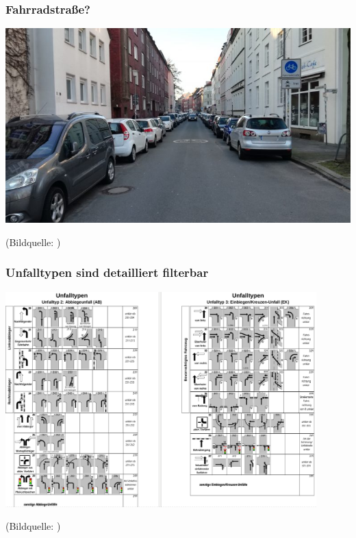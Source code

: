 \documentclass{beamer}
\begin{document}
\begin{frame}
  \frametitle{Fahrradstraße?}
  
  \centering
  
  \includegraphics[width=\textwidth]{img/schillerstrasse.jpg}
  
  \vfill  
  {\scriptsize (Bildquelle: \cite{Chrobak2018})}
\end{frame}

\begin{frame}
  \frametitle{Unfalltypen sind detailliert filterbar}
  \centering
  
  \includegraphics[width=0.9\textwidth]{img/unfalltyp-details.png}
  
  \vfill
  {\scriptsize (Bildquelle: \cite[\href{https://recht.nrw.de/lmi/owa/br_show_anlage?p_id=15549}{Anlage 9}]{IMNRW2019})\par}
\end{frame}
\end{document}
